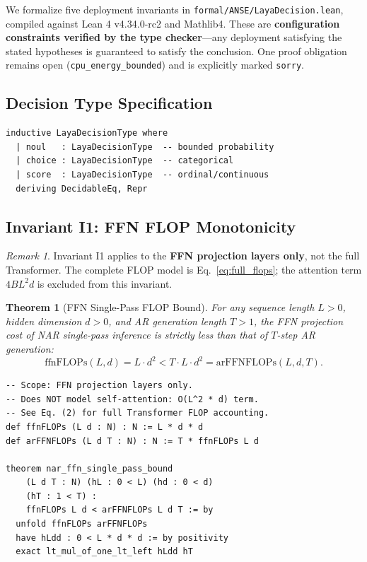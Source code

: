 \documentclass[10pt,journal,compsoc]{IEEEtran}
\newtheorem{theorem}{Theorem}
\theoremstyle{remark}
\newtheorem{remark}{Remark}
\begin{document}
We formalize five deployment invariants in \texttt{formal/ANSE/LayaDecision.lean}, compiled against Lean 4 v4.34.0-rc2 and Mathlib4. These are \textbf{configuration constraints verified by the type checker}---any deployment satisfying the stated hypotheses is guaranteed to satisfy the conclusion. One proof obligation remains open (\texttt{cpu\_energy\_bounded}) and is explicitly marked \texttt{sorry}.

\subsection{Decision Type Specification}

\begin{lstlisting}[caption={Laya Decision Types in Lean 4}]
inductive LayaDecisionType where
  | noul   : LayaDecisionType  -- bounded probability
  | choice : LayaDecisionType  -- categorical
  | score  : LayaDecisionType  -- ordinal/continuous
  deriving DecidableEq, Repr
\end{lstlisting}

\subsection{Invariant I1: FFN FLOP Monotonicity}

\begin{remark}
Invariant I1 applies to the \textbf{FFN projection layers only}, not the full Transformer. The complete FLOP model is Eq.~\eqref{eq:full_flops}; the attention term $4BL^2d$ is excluded from this invariant.
\end{remark}

\begin{theorem}[FFN Single-Pass FLOP Bound]
\label{thm:I1}
For any sequence length $L > 0$, hidden dimension $d > 0$, and AR generation length $T > 1$, the FFN projection cost of NAR single-pass inference is strictly less than that of $T$-step AR generation:
\begin{equation}
\label{eq:ffn_flops}
\text{ffnFLOPs}(L, d) = L \cdot d^2 < T \cdot L \cdot d^2 = \text{arFFNFLOPs}(L, d, T).
\end{equation}
\end{theorem}

\begin{lstlisting}[caption={Invariant I1 in Lean 4 (FFN layers only)}]
-- Scope: FFN projection layers only.
-- Does NOT model self-attention: O(L^2 * d) term.
-- See Eq. (2) for full Transformer FLOP accounting.
def ffnFLOPs (L d : N) : N := L * d * d
def arFFNFLOPs (L d T : N) : N := T * ffnFLOPs L d

theorem nar_ffn_single_pass_bound
    (L d T : N) (hL : 0 < L) (hd : 0 < d)
    (hT : 1 < T) :
    ffnFLOPs L d < arFFNFLOPs L d T := by
  unfold ffnFLOPs arFFNFLOPs
  have hLdd : 0 < L * d * d := by positivity
  exact lt_mul_of_one_lt_left hLdd hT
\end{lstlisting}
\end{document}
